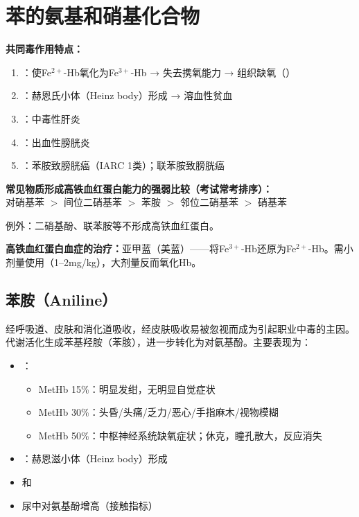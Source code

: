 \section{苯的氨基和硝基化合物}

\begin{keybox}
\textbf{共同毒作用特点：}
\begin{enumerate}[leftmargin=*]
    \item {}：使Fe$^{2+}$-Hb氧化为Fe$^{3+}$-Hb → 失去携氧能力 → 组织缺氧（）
    \item {}：赫恩氏小体（Heinz body）形成 → 溶血性贫血
    \item {}：中毒性肝炎
    \item {}：出血性膀胱炎
    \item {}：苯胺致膀胱癌（IARC 1类）；联苯胺致膀胱癌
\end{enumerate}

\begin{exambox}
\textbf{常见物质形成高铁血红蛋白能力的强弱比较（考试常考排序）：}\\
对硝基苯 $>$ 间位二硝基苯 $>$ 苯胺 $>$ 邻位二硝基苯 $>$ 硝基苯

例外：二硝基酚、联苯胺等不形成高铁血红蛋白。
\end{exambox}

\textbf{高铁血红蛋白血症的治疗：}亚甲蓝（美蓝）——将Fe$^{3+}$-Hb还原为Fe$^{2+}$-Hb。需小剂量使用（1--2mg/kg），大剂量反而氧化Hb。

\subsection{苯胺（Aniline）}
经呼吸道、皮肤和消化道吸收，经皮肤吸收易被忽视而成为引起职业中毒的主因。代谢活化生成苯基羟胺（苯胲），进一步转化为对氨基酚。主要表现为：
\begin{itemize}[leftmargin=*]
    \item {}：
    \begin{itemize}
        \item MetHb 15\%：明显发绀，无明显自觉症状
        \item MetHb 30\%：头昏/头痛/乏力/恶心/手指麻木/视物模糊
        \item MetHb 50\%：中枢神经系统缺氧症状；休克，瞳孔散大，反应消失
    \end{itemize}
    \item {}：赫恩滋小体（Heinz body）形成
    \item {}和
    \item 尿中对氨基酚增高（接触指标）
\end{itemize}


\end{keybox}
